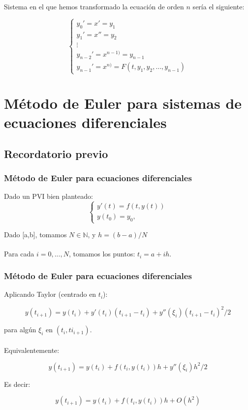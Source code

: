 \documentclass{beamer}
\begin{document}
\begin{frame}
	
	Sistema en el que hemos transformado la ecuación de orden $n$ sería el siguiente:
	
	$$
	\begin{cases}
	y_0' = x' = y_1\\
	y_1' = x'' = y_2\\
	\vdots\\
	y_{n-2}' = x^{n-1)} = y_{n-1}\\
	y_{n-1}' = x^{n)} = F(t, y_1, y_2, \dots, y_{n-1})
	\end{cases}
	$$
	
\end{frame}

\section{Método de Euler para sistemas de ecuaciones diferenciales}
\subsection{Recordatorio previo}
\begin{frame}
	\frametitle{Método de Euler para ecuaciones diferenciales}
	
	Dado un PVI bien planteado:
	$$
	\begin{cases}
	y'(t)=f(t,y(t)) \\ 
	y(t_0)=y_0, 
	\end{cases}
	$$
	
	Dado [a,b], tomamos $N \in \mathbb{N}$, y $h=(b-a)/N$\\~\\
	Para cada $i=0,...,N$, tomamos los puntos: $t_i=a+ih$.
	
\end{frame}

\begin{frame}
	\frametitle{Método de Euler para ecuaciones diferenciales}
	Aplicando Taylor (centrado en $t_i$):

	$$y(t_{i+1})=y(t_i) + y'(t_i)(t_{i+1}-t_i) + y''(\xi_i)(t_{i+1}-t_i)^2/2$$ 

	para algún $\xi_i$ en $(t_i, ti_{i+1})$.\\~\\
	
	Equivalentemente:
	
	$$y(t_{i+1})=y(t_i) + f(t_i,y(t_i))h + y''(\xi_i)h^2/2$$
	
	Es decir: 
	
	$$y(t_{i+1})=y(t_i) + f(t_i,y(t_i))h + O(h^2)$$ 
	
\end{frame}
\end{document}
